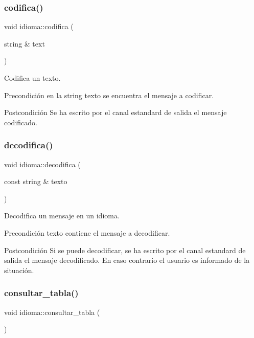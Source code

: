 \subsubsection{\texorpdfstring{codifica()}{codifica()}}
{\footnotesize\ttfamily void idioma\+::codifica (\begin{DoxyParamCaption}\item[{string \&}]{text }\end{DoxyParamCaption})}



Codifica un texto. 

\begin{DoxyPrecond}{Precondición}
en la string texto se encuentra el mensaje a codificar. 
\end{DoxyPrecond}
\begin{DoxyPostcond}{Postcondición}
Se ha escrito por el canal estandard de salida el mensaje codificado. 
\end{DoxyPostcond}
\mbox{\label{classidioma_a901e5b496773705624ae82bdcf15fac8}} 
\subsubsection{\texorpdfstring{decodifica()}{decodifica()}}
{\footnotesize\ttfamily void idioma\+::decodifica (\begin{DoxyParamCaption}\item[{const string \&}]{texto }\end{DoxyParamCaption})}



Decodifica un mensaje en un idioma. 

\begin{DoxyPrecond}{Precondición}
texto contiene el mensaje a decodificar. 
\end{DoxyPrecond}
\begin{DoxyPostcond}{Postcondición}
Si se puede decodificar, se ha escrito por el canal estandard de salida el mensaje decodificado. En caso contrario el usuario es informado de la situación. 
\end{DoxyPostcond}
\mbox{\label{classidioma_a3b803dbdff20ebe884dd8e66550a856f}} 
\subsubsection{\texorpdfstring{consultar\+\_\+tabla()}{consultar\_tabla()}}
{\footnotesize\ttfamily void idioma\+::consultar\+\_\+tabla (\begin{DoxyParamCaption}{ }\end{DoxyParamCaption})}



